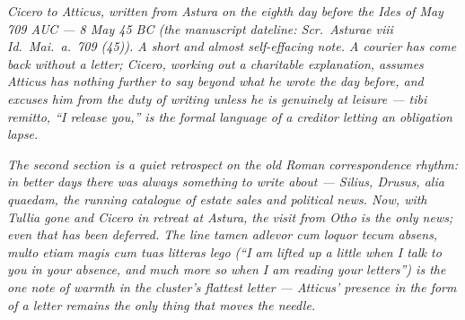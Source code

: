 
\textit{Cicero to Atticus, written from Astura on the
eighth day before the Ides of May 709 AUC --- 8 May 45
BC (the manuscript dateline: \textit{Scr.\ Asturae
viii Id.\ Mai.\ a.\ 709 (45)}). A short and almost
self-effacing note. A courier has come back without a
letter; Cicero, working out a charitable explanation,
assumes Atticus has nothing further to say beyond what
he wrote the day before, and excuses him from the
duty of writing unless he is genuinely at leisure ---
\textit{tibi remitto}, ``I release you,'' is the
formal language of a creditor letting an obligation
lapse.}

\textit{The second section is a quiet retrospect on
the old Roman correspondence rhythm: in better days
there was always something to write about ---
\textit{Silius, Drusus, alia quaedam}, the running
catalogue of estate sales and political news. Now,
with Tullia gone and Cicero in retreat at Astura,
the visit from Otho is the only news; even that has
been deferred. The line \textit{tamen adlevor cum
loquor tecum absens, multo etiam magis cum tuas
litteras lego} (``I am lifted up a little when I talk
to you in your absence, and much more so when I am
reading your letters'') is the one note of warmth in
the cluster's flattest letter --- Atticus' presence
in the form of a letter remains the only thing that
moves the needle.}
